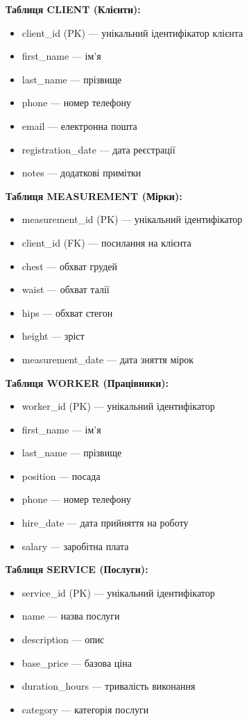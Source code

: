 \documentclass[14pt,a4paper]{extarticle}
\begin{document}
\textbf{Таблиця CLIENT (Клієнти):}
\begin{itemize}
    \item client\_id (PK) --- унікальний ідентифікатор клієнта
    \item first\_name --- ім'я
    \item last\_name --- прізвище
    \item phone --- номер телефону
    \item email --- електронна пошта
    \item registration\_date --- дата реєстрації
    \item notes --- додаткові примітки
\end{itemize}

\textbf{Таблиця MEASUREMENT (Мірки):}
\begin{itemize}
    \item measurement\_id (PK) --- унікальний ідентифікатор
    \item client\_id (FK) --- посилання на клієнта
    \item chest --- обхват грудей
    \item waist --- обхват талії
    \item hips --- обхват стегон
    \item height --- зріст
    \item measurement\_date --- дата зняття мірок
\end{itemize}

\textbf{Таблиця WORKER (Працівники):}
\begin{itemize}
    \item worker\_id (PK) --- унікальний ідентифікатор
    \item first\_name --- ім'я
    \item last\_name --- прізвище
    \item position --- посада
    \item phone --- номер телефону
    \item hire\_date --- дата прийняття на роботу
    \item salary --- заробітна плата
\end{itemize}

\textbf{Таблиця SERVICE (Послуги):}
\begin{itemize}
    \item service\_id (PK) --- унікальний ідентифікатор
    \item name --- назва послуги
    \item description --- опис
    \item base\_price --- базова ціна
    \item duration\_hours --- тривалість виконання
    \item category --- категорія послуги
\end{itemize}
\end{document}
